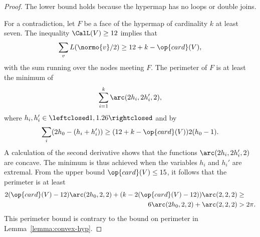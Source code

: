 \begin{proof} The lower bound holds because the hypermap has no loops
  or double joins.  

For a contradiction, let $F$ be a face of the
  hypermap of cardinality $k$ at least seven.  The inequality $\CalL(V)\ge 12$
implies that
\begin{equation}\label{eqn:L7}
\sum_{v} L(\normo{v}/2) \ge 12+k-\op{card}(V),
\end{equation}
with the sum running over the nodes meeting $F$.
The perimeter of $F$ is at least the minimum of
\[
\sum_{i=1}^k \arc(2h_i,2h_i',2),
\]
where $h_i,h_i'\in \leftclosed 1,1.26\rightclosed$ and by 
\[
\sum_{i} (2h_0 - (h_i+h_i')) \ge (12+k - \op{card}(V)) 2 (h_0-1).
\]
A calculation of the second derivative shows that the functions $\arc(2h_i,2h_i',2)$ are concave.
The minimum is thus achieved when the variables $h_i$ and $h_i'$ are extremal.  From
the upper bound $\op{card}(V)\le 15$, it follows that the perimeter
is at least
\begin{align*}
2 (\op{card}(V) -12) \arc(2h_0,2,2) + (k - 2(\op{card}(V)-12)) \arc(2,2,2) &\ge\\
6 \arc(2h_0,2,2) + \arc(2,2,2) &> 2\pi.
\end{align*}
This perimeter bound is contrary to the bound on
perimeter in Lemma~\ref{lemma:convex-hyp}.
\end{proof}


%
%





